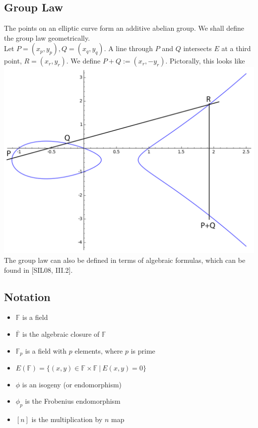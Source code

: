 \documentclass[12pt,twoside]{article}
\newcommand\given[1][]{\:#1\vert\:}
\begin{document}
\subsection{Group Law} 
The points on an elliptic curve form an additive abelian group. We shall define the group law geometrically. \\
Let $P = (x_p, y_p), Q = (x_q, y_q)$. A line through $P$ and $Q$ intersects $E$ at a third point, $R = (x_r,y_r)$. We define $P + Q := (x_r,-y_r)$. Pictorally, this looks like \\
\includegraphics[width=6in]{grouplaw.png}
The group law can also be defined in terms of algebraic formulas, which can be found in [SIL08, III.2].

\subsection{Notation}
\begin{itemize}
\item $\mathbb F$ is a field
\item $\overline{\mathbb F}$ is the algebraic closure of $\mathbb F$
\item $\mathbb F_p$ is a field with $p$ elements, where $p$ is prime
\item $E(\mathbb F) = \{(x,y) \in \mathbb F \times \mathbb F \given E(x,y) = 0\}$
\item $\phi$ is an isogeny (or endomorphism)
\item $\phi_p$ is the Frobenius endomorphism
\item $[n]$ is the multiplication by $n$ map
\end{itemize}
\end{document}
